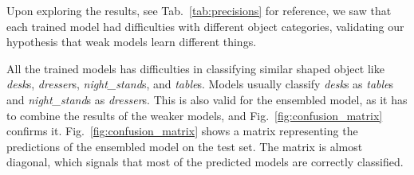 \begin{table}[h]
\begin{tabular}{|c||c|c|c|c|c||c|}
	\end{tabular}
\end{table}

Upon exploring the results, see Tab.~\ref{tab:precisions} for reference, we saw that each trained model had difficulties with different object categories, validating our hypothesis that weak models learn different things. 

All the trained models has difficulties in classifying similar shaped object like \textit{desk}s, \textit{dresser}s, \textit{night\_stand}s, and \textit{table}s. Models usually classify \textit{desk}s as \textit{table}s and \textit{night\_stand}s as \textit{dresser}s. 
This is also valid for the ensembled model, as it has to combine the results of the weaker models, and Fig.~\ref{fig:confusion_matrix} confirms it.
Fig.~\ref{fig:confusion_matrix} shows a matrix representing the predictions of the ensembled model on the test set. The matrix is almost diagonal, which signals that most of the predicted models are correctly classified.

